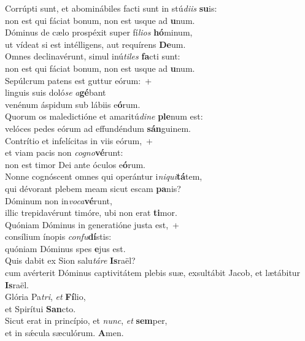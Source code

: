 \evenverse Corrúpti sunt, et abominábiles facti sunt in stú\textit{di}\textit{is} \textbf{su}is:~\*\\
\evenverse non est qui fáciat bonum, non est usque ad \textbf{u}num.\\
\oddverse Dóminus de cælo prospéxit super fí\textit{li}\textit{os} \textbf{hó}minum,~\*\\
\oddverse ut vídeat si est intélligens, aut requírens \textbf{De}um.\\
\evenverse Omnes declinavérunt, simul inú\textit{ti}\textit{les} \textbf{fa}cti sunt:~\*\\
\evenverse non est qui fáciat bonum, non est usque ad \textbf{u}num.\\
\oddverse Sepúlcrum patens est guttur eórum:~+\\
\oddverse  linguis suis doló\textit{se} \textit{a}\textbf{gé}bant~\*\\
\oddverse venénum áspidum sub lábiis e\textbf{ó}rum.\\
\evenverse Quorum os maledictióne et amaritú\textit{di}\textit{ne} \textbf{ple}num est:~\*\\
\evenverse velóces pedes eórum ad effundéndum \textbf{sán}guinem.\\
\oddverse Contrítio et infelícitas in viis eórum,~+\\
\oddverse  et viam pacis non \textit{co}\textit{gno}\textbf{vé}runt:~\*\\
\oddverse non est timor Dei ante óculos e\textbf{ó}rum.\\
\evenverse Nonne cognóscent omnes qui operántur i\textit{ni}\textit{qui}\textbf{tá}tem,~\*\\
\evenverse qui dévorant plebem meam sicut escam \textbf{pa}nis?\\
\oddverse Dóminum non in\textit{vo}\textit{ca}\textbf{vé}runt,~\*\\
\oddverse illic trepidavérunt timóre, ubi non erat \textbf{ti}mor.\\
\evenverse Quóniam Dóminus in generatióne justa est,~+\\
\evenverse  consílium ínopis \textit{con}\textit{fu}\textbf{dí}stis:~\*\\
\evenverse quóniam Dóminus spes \textbf{e}jus est.\\
\oddverse Quis dabit ex Sion salu\textit{tá}\textit{re} \textbf{Is}raël?~\*\\
\oddverse cum avérterit Dóminus captivitátem plebis suæ, exsultábit Jacob, et lætábitur \textbf{Is}raël.\\
\evenverse Glória Pa\textit{tri}, \textit{et} \textbf{Fí}lio,~\*\\
\evenverse et Spirítui \textbf{San}cto.\\
\oddverse Sicut erat in princípio, et \textit{nunc}, \textit{et} \textbf{sem}per,~\*\\
\oddverse et in sǽcula sæculórum. \textbf{A}men.\\
